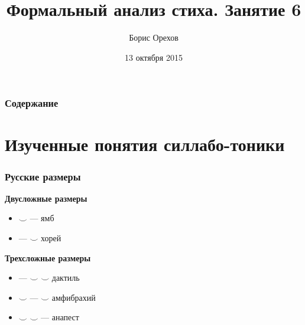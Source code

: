 \documentclass{beamer}
\title[Занятие 6]{Формальный анализ стиха. Занятие 6} %
\author{Борис Орехов} %
\institute[НИУ ВШЭ] %
{
НИУ Высшая школа экономики \\ %
\medskip
\textit{nevmenandr@gmail.com} %
}
\date{13 октября 2015} %
\begin{document}
\begin{frame}
\titlepage %
\end{frame}



\begin{frame}
\frametitle{Содержание}  %
\tableofcontents %
\end{frame}


\section{Изученные понятия силлабо-тоники}\label{sec:rusyl}

\begin{frame}
\frametitle{Русские размеры}
\begin{center}
\textbf{Двусложные размеры}
\end{center}

\begin{itemize}
\item  $\smile$ --- ямб
\item  --- $\smile$ хорей
\end{itemize}

\begin{center}
\textbf{Трехсложные размеры}
\end{center}

\begin{itemize}
\item  --- $\smile$ $\smile$ дактиль
\item  $\smile$ --- $\smile$ амфибрахий
\item  $\smile$ $\smile$ --- анапест
\end{itemize}

\end{frame}
\end{document}

